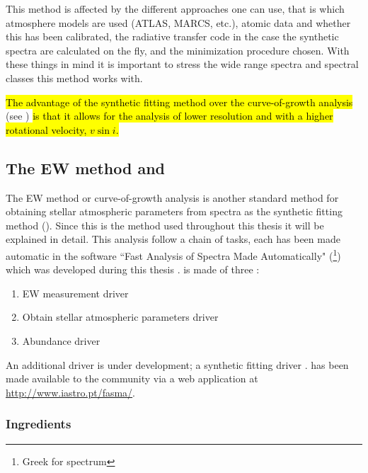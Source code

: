 This method is affected by the different approaches one can use, that is which atmosphere models are
used (ATLAS, MARCS, etc.), atomic data and whether this has been calibrated, the radiative transfer
code in the case the synthetic spectra are calculated on the fly, and the minimization procedure
chosen. With these things in mind it is important to stress the wide range spectra and spectral
classes this method works with.

\hl{The advantage of the synthetic fitting method over the curve-of-growth analysis} (see
) \hl{is that it allows for the analysis of lower resolution and with a higher
rotational velocity, $v\sin i$.}


\subsection{The EW method and }
\label{sec:parameters}

The EW method or curve-of-growth analysis is another standard method for obtaining stellar
atmospheric parameters from spectra as the synthetic fitting method (). Since
this is the method used throughout this thesis it will be explained in detail. This analysis follow
a chain of tasks, each has been made automatic in the software ``Fast Analysis of Spectra Made
Automatically" (\footnote{Greek for spectrum}) which was developed during this thesis
\citep{Andreasen2017a}.  is made of three :
\begin{enumerate}
  \item EW measurement driver
  \item Obtain stellar atmospheric parameters driver
  \item Abundance driver
\end{enumerate}
An additional driver is under development; a synthetic fitting driver \citep{Tsantaki2017}.
 has been made available to the community via a web application at
\url{http://www.iastro.pt/fasma/}.


\subsubsection{Ingredients}

